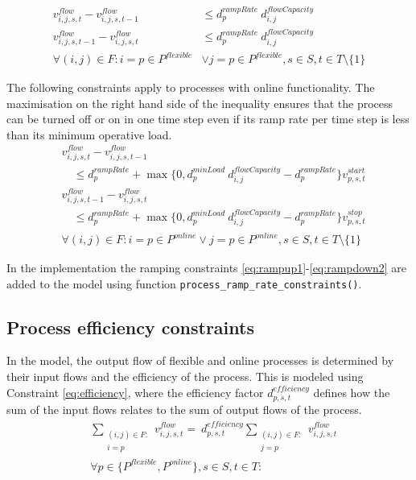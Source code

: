 \documentclass{article}
\begin{document}
\begin{align}
     v^{flow}_{i,j,s,t} -  v^{flow}_{i,j,s,t-1} &\leq d^{rampRate}_{p} \ d_{i,j}^{flowCapacity} \label{eq:rampup1} \\[0.5cm]
     v^{flow}_{i,j,s,t-1} -  v^{flow}_{i,j,s,t} &\leq d^{rampRate}_{p} \ d_{i,j}^{flowCapacity} \label{eq:rampdown1} \\[0.5cm]
    \forall (i,j) \in F: i = p\in P^{flexible}& \lor j=p \in P^{flexible}, s \in S, t \in T \setminus \{1\} \nonumber
\end{align}



The following constraints apply to processes with online functionality. The maximisation on the right hand side of the inequality ensures that the process can be turned off or on in one time step even if its ramp rate per time step is less than its minimum operative load.
\begin{align}
     & v^{flow}_{i,j,s,t} -  v^{flow}_{i,j,s,t-1}  \nonumber \\ 
    & \quad \leq d^{rampRate}_{p} + \max \{0, d^{minLoad}_{p} \ d^{flowCapacity}_{i,j} - d^{rampRate}_{p} \}  v^{start}_{p,s,t} \label{eq:rampup2} \\[0.5cm]
    & v^{flow}_{i,j,s,t-1} -  v^{flow}_{i,j,s,t}  \nonumber \\ 
    & \quad  \leq d^{rampRate}_{p} + \max \{0, d^{minLoad}_{p} \ d^{flowCapacity}_{i,j} - d^{rampRate}_{p} \} v^{stop}_{p,s,t} \label{eq:rampdown2}\\[0.5cm]
    &\forall (i,j) \in F: i = p\in P^{online} \lor j=p \in P^{online}, s \in S, t \in T \setminus \{1\} \nonumber
\end{align}

In the implementation the ramping constraints \eqref{eq:rampup1}-\eqref{eq:rampdown2} are added to the model using function \texttt{process\_ramp\_rate\_constraints()}.


\subsection{Process efficiency constraints}

In the model, the output flow of flexible and online processes is determined by their input flows and the efficiency of the process. This is modeled using Constraint \eqref{eq:efficiency}, where the efficiency factor $d^{efficiency}_{p,s,t}$ defines how the sum of the input flows relates to the sum of output flows of the process.
\begin{align}
    & \sum_{\substack{(i,j) \in F: \\ i = p}} v^{flow}_{i,j,s,t} = \ d^{efficiency}_{p,s,t} \sum_{\substack{(i,j) \in F: \\ j = p}} v^{flow}_{i,j,s,t} \label{eq:efficiency} \\
    &\forall p \in \{P^{flexible}, P^{online}\}, s \in S, t\in T: \nonumber
\end{align}
\end{document}
